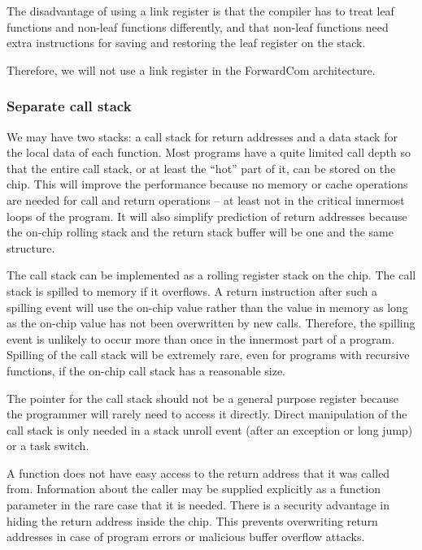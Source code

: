 \documentclass[forwardcom.tex]{subfiles}
\begin{document}
The disadvantage of using a link register is that the compiler has to treat leaf functions and non-leaf functions differently, and that non-leaf functions need extra instructions for saving and restoring the leaf register on the stack.
\vspace{2mm}

Therefore, we will not use a link register in the ForwardCom architecture.

\subsubsection{Separate call stack} \label{dualStack}
We may have two stacks: 
a call stack for return addresses and a data stack for the local data of each function. Most programs have a quite limited call depth so that the entire call stack, or at least the ``hot'' part of it, can be stored on the chip. This will improve the performance because no memory or cache operations are needed for call and return operations -- at least not in the critical innermost loops of the program. It will also simplify prediction of return addresses because the on-chip rolling stack and the return stack buffer will be one and the same structure.
\vspace{2mm}

The call stack can be implemented as a rolling register stack on the chip. The call stack is spilled to memory if it overflows. A return instruction after such a spilling event will use the on-chip value rather than the value in memory as long as the on-chip value has not been overwritten by new calls. Therefore, the spilling event is unlikely to occur more than once in the innermost part of a program. 
Spilling of the call stack will be extremely rare, even for programs with recursive functions, if the on-chip call stack has a reasonable size.
\vspace{2mm}

The pointer for the call stack should not be a general purpose register because the programmer will rarely need to access it directly. Direct manipulation of the call stack is only needed in a stack unroll event (after an exception or long jump) or a task switch.
\vspace{2mm}

A function does not have easy access to the return address that it was called from. Information about the caller may be supplied explicitly as a function parameter in the rare case that it is needed. There is a security advantage in hiding the return address inside the chip. This prevents overwriting return addresses in case of program errors or malicious buffer overflow attacks.
\vspace{2mm}
\end{document}
